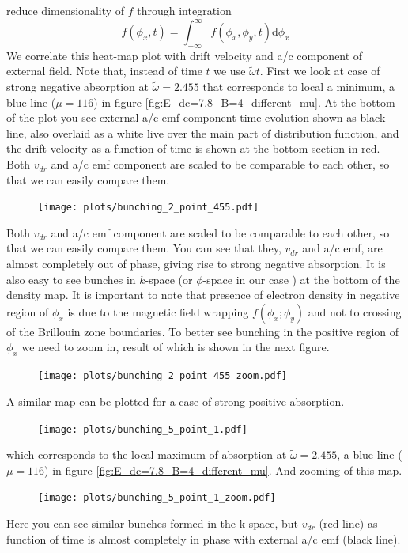 \documentclass[40pt,letterpaper,physrev]{article}
\begin{document}
    reduce dimensionality of $f$ through integration
    \begin{equation}
        f(\phi_x,t)=\int^{\infty}_{-\infty}f(\phi_x,\phi_y,t)\text{d}\phi_x
    \end{equation}
    We correlate this heat-map plot with drift velocity and a/c component of external field. Note that, instead of time 
    $t$ we use $\tilde{\omega}t$. First we look at case of strong negative absorption at $\tilde{\omega} = 2.455$ that
    corresponds to local a minimum, a blue line ($\mu = 116$) in figure \ref{fig:E_dc=7.8_B=4_different_mu}. At the
    bottom of the plot you see external a/c emf component time evolution shown as black line, also overlaid as a white
    live over the main part of distribution function, and the drift velocity as a function of time is shown at the bottom
    section in red. Both $v_{dr}$ and a/c emf component are scaled to be comparable to each other, so that we can easily
    compare them.
	\begin{figure}[H]
	  \centering
	  \normalsize %
	  \texttt{[image: plots/bunching\_2\_point\_455.pdf]}
	  \caption{}	  
	\end{figure}
	Both $v_{dr}$ and a/c emf component are scaled to be comparable to each other, so that we can easily compare them.
	You can see that they, $v_{dr}$ and a/c emf, are almost completely out of phase, giving rise to strong negative
	absorption. It is also easy to see bunches in $k$-space (or $\phi$-space in our case ) at the bottom of the density
	map. It	is important to note that presence of electron density in negative region of $\phi_x$ is due to the magnetic
	field wrapping $f(\phi_x; \phi_y)$ and not to crossing of the Brillouin zone boundaries. To better see bunching in
	the positive region of $\phi_x$ we need to zoom in, result of which is shown in the next figure.
	\begin{figure}[H]
	  \centering
	  \normalsize %
	  \texttt{[image: plots/bunching\_2\_point\_455\_zoom.pdf]}
	  \caption{}	  
	\end{figure}
	\newpage
    A similar map can be plotted for a case of strong positive absorption.
	\begin{figure}[H]
	  \centering
	  \normalsize %
	  \texttt{[image: plots/bunching\_5\_point\_1.pdf]}
	  \caption{}	  
	\end{figure}
	which corresponds to the local maximum of absorption at $\tilde{\omega} = 2.455$, a blue line ($\mu = 116$) 
	in figure \ref{fig:E_dc=7.8_B=4_different_mu}. And zooming of this map.
	\begin{figure}[H]
	  \centering
	  \normalsize %
	  \texttt{[image: plots/bunching\_5\_point\_1\_zoom.pdf]}
	  \caption{}	  
	\end{figure}    
	Here you can see similar bunches formed in the k-space, but $v_{dr}$ (red line) as function of time is almost
    completely in phase with external a/c emf (black line).
\end{document}
